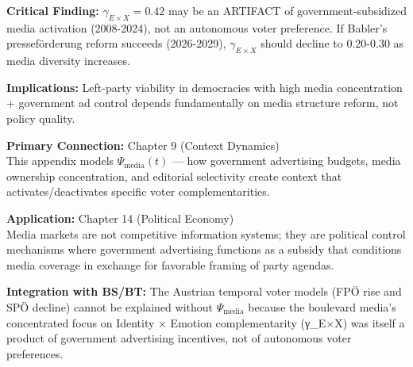 \textbf{Critical Finding:} $\gamma_{E \times X} = 0.42$ may be an ARTIFACT
of government-subsidized media activation (2008-2024), not an autonomous voter
preference. If Babler's presseförderung reform succeeds (2026-2029), $\gamma_{E \times X}$
should decline to 0.20-0.30 as media diversity increases.

\textbf{Implications:} Left-party viability in democracies with high media
concentration + government ad control depends fundamentally on media structure
reform, not policy quality.

\vspace{0.5cm}

%
%
%
%

\begin{tcolorbox}[colback=orange!5!white, colframe=orange!75!black,
    title=Chapter Linkage]
\textbf{Primary Connection:} Chapter 9 (Context Dynamics) \\
This appendix models $\Psi_{\text{media}}(t)$ — how government advertising
budgets, media ownership concentration, and editorial selectivity create
context that activates/deactivates specific voter complementarities.

\textbf{Application:} Chapter 14 (Political Economy)\\
Media markets are not competitive information systems; they are political
control mechanisms where government advertising functions as a subsidy that
conditions media coverage in exchange for favorable framing of party agendas.

\textbf{Integration with BS/BT:} The Austrian temporal voter models (FPÖ rise
and SPÖ decline) cannot be explained without $\Psi_{\text{media}}$ because
the boulevard media's concentrated focus on Identity × Emotion complementarity
(γ_{E×X}) was itself a product of government advertising incentives, not of
autonomous voter preferences.
\end{tcolorbox}

